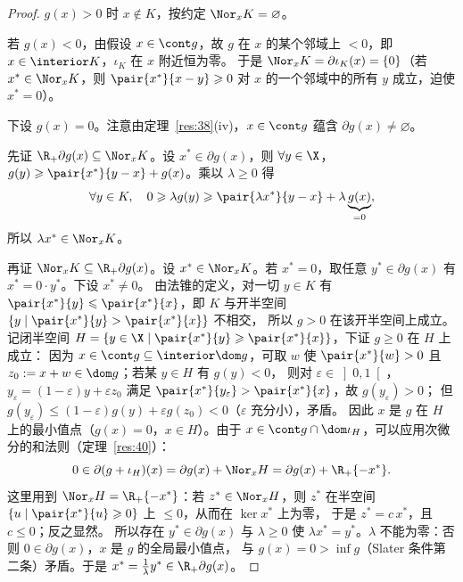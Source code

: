 \begin{proof}
$g(x)>0$ 时 $x\notin K$，按约定 $\Nor_xK=\varnothing$。

若 $g(x)<0$，由假设 $x\in\cont g$，故 $g$ 在 $x$ 的某个邻域上 $<0$，即 $x\in\interior K$，$\iota_K$ 在 $x$ 附近恒为零。
于是 $\Nor_xK=\partial\iota_K(x)=\{0\}$（若 $x^*\in\Nor_xK$，则 $\pair{x^*}{x-y}\geqslant0$ 对 $x$ 的一个邻域中的所有 $y$ 成立，迫使 $x^*=0$）。

下设 $g(x)=0$。注意由定理~\ref{res:38}(iv)，$x\in\cont g$ 蕴含 $\partial g(x)\neq\varnothing$。

先证 $\R_+\partial g(x)\subseteq\Nor_xK$。设 $x^*\in\partial g(x)$，则 $\forall y\in\X$，$g(y)\geqslant\pair{x^*}{y-x}+g(x)$。乘以 $\lambda\geqslant0$ 得
\[
  \forall y\in K,\quad0\geqslant\lambda g(y)\geqslant\pair{\lambda x^*}{y-x}+\lambda\underbrace{g(x)}_{=0},
\]
所以 $\lambda x^*\in\Nor_xK$。

再证 $\Nor_xK\subseteq\R_+\partial g(x)$。设 $x^*\in\Nor_xK$。若 $x^*=0$，取任意 $y^*\in\partial g(x)$ 有 $x^*=0\cdot y^*$。下设 $x^*\neq0$。
由法锥的定义，对一切 $y\in K$ 有 $\pair{x^*}{y}\leqslant\pair{x^*}{x}$，即 $K$ 与开半空间 $\{y\mid\pair{x^*}{y}>\pair{x^*}{x}\}$ 不相交，
所以 $g>0$ 在该开半空间上成立。记闭半空间 $H=\{y\in\X\mid\pair{x^*}{y}\geqslant\pair{x^*}{x}\}$，下证 $g\geqslant0$ 在 $H$ 上成立：
因为 $x\in\cont g\subseteq\interior\dom g$，可取 $w$ 使 $\pair{x^*}{w}>0$ 且 $z_0:=x+w\in\dom g$；若某 $y\in H$ 有 $g(y)<0$，
则对 $\varepsilon\in\left]0,1\right[$，$y_\varepsilon=(1-\varepsilon)y+\varepsilon z_0$ 满足 $\pair{x^*}{y_\varepsilon}>\pair{x^*}{x}$，故 $g(y_\varepsilon)>0$；
但 $g(y_\varepsilon)\leqslant(1-\varepsilon)g(y)+\varepsilon g(z_0)<0$（$\varepsilon$ 充分小），矛盾。
因此 $x$ 是 $g$ 在 $H$ 上的最小值点（$g(x)=0$，$x\in H$）。由于 $x\in\cont g\cap\dom\iota_H$，可以应用次微分的和法则（定理~\ref{res:40}）：
\[
  0\in\partial(g+\iota_H)(x)=\partial g(x)+\Nor_xH=\partial g(x)+\R_+\{-x^*\}.
\]
这里用到 $\Nor_xH=\R_+\{-x^*\}$：若 $z^*\in\Nor_xH$，则 $z^*$ 在半空间 $\{u\mid\pair{x^*}{u}\geqslant0\}$ 上 $\leqslant0$，从而在 $\ker x^*$ 上为零，
于是 $z^*=c\,x^*$，且 $c\leqslant0$；反之显然。
所以存在 $y^*\in\partial g(x)$ 与 $\lambda\geqslant0$ 使 $\lambda x^*=y^*$。$\lambda$ 不能为零：否则 $0\in\partial g(x)$，$x$ 是 $g$ 的全局最小值点，
与 $g(x)=0>\inf g$（Slater 条件第二条）矛盾。于是 $x^*=\frac1\lambda y^*\in\R_+\partial g(x)$。
\end{proof}

